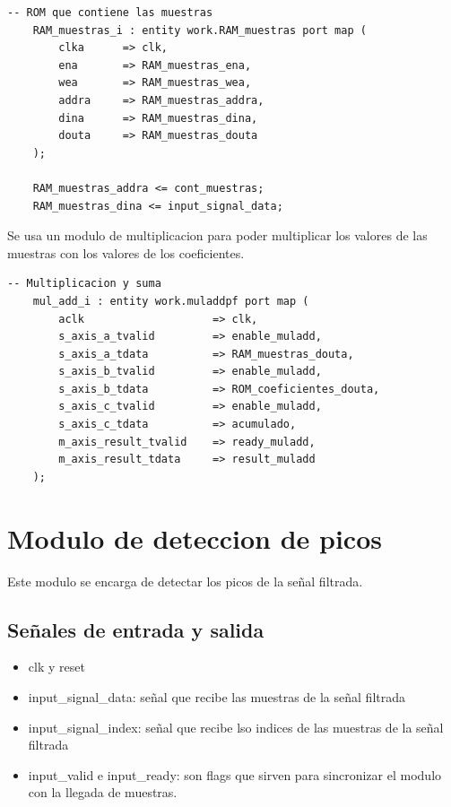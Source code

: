\lstset{language=VHDL, breaklines=true, basicstyle=\footnotesize}
\begin{lstlisting}[frame=single]
    -- ROM que contiene las muestras 
    RAM_muestras_i : entity work.RAM_muestras port map (
        clka      => clk,
        ena       => RAM_muestras_ena,
        wea       => RAM_muestras_wea,
        addra     => RAM_muestras_addra,
        dina      => RAM_muestras_dina,
        douta     => RAM_muestras_douta
    );    
    
    RAM_muestras_addra <= cont_muestras;
    RAM_muestras_dina <= input_signal_data;
\end{lstlisting}

Se usa un modulo de multiplicacion para poder multiplicar los valores de las muestras con los valores de los coeficientes.

\lstset{language=VHDL, breaklines=true, basicstyle=\footnotesize}
\begin{lstlisting}[frame=single] 
    -- Multiplicacion y suma 
    mul_add_i : entity work.muladdpf port map (
        aclk                    => clk,
        s_axis_a_tvalid         => enable_muladd,
        s_axis_a_tdata          => RAM_muestras_douta,
        s_axis_b_tvalid         => enable_muladd,
        s_axis_b_tdata          => ROM_coeficientes_douta,
        s_axis_c_tvalid         => enable_muladd,
        s_axis_c_tdata          => acumulado,                
        m_axis_result_tvalid    => ready_muladd,
        m_axis_result_tdata     => result_muladd
    );
\end{lstlisting}

\section{Modulo de deteccion de picos}

Este modulo se encarga de detectar los picos de la señal filtrada. 
\subsection{Señales de entrada y salida}
    \begin{itemize}
    \item clk y reset
    \item input\_signal\_data: señal que recibe las muestras de la señal filtrada 
    \item input\_signal\_index: señal que recibe lso indices de las muestras de la señal filtrada 
    \item input\_valid e input\_ready: son flags que sirven para sincronizar el modulo con la llegada de muestras. 
    \end{itemize}
    

